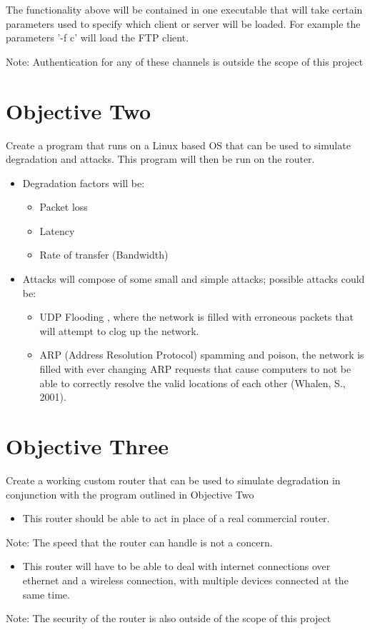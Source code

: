 The functionality above will be contained in one executable that will take certain parameters used to specify which client or server will be loaded. For example the parameters '-f c' will load the FTP client.

Note: Authentication for any of these channels is outside the scope of this project


\section{Objective Two}
\label{sec:obj2}
\label{ref:obj2}
Create a program that runs on a Linux based OS that can be used to simulate degradation and attacks. This program will then be run on the router.

\begin{itemize}
\item Degradation factors will be:
	\begin{itemize}
	\item Packet loss
	\item Latency
	\item Rate of transfer (Bandwidth)
	\end{itemize}
\item Attacks will compose of some small and simple attacks; possible attacks could be:
	\begin{itemize}
	\item UDP Flooding \citep{xiaoming2010denial}, where the network is filled with erroneous packets that will attempt to clog up the network.
	\item ARP (Address Resolution Protocol) spamming and poison, the network is filled with ever changing ARP requests that cause computers to not be able to correctly resolve the 	valid locations of each other (Whalen, S., 2001).
	\end{itemize}
\end{itemize}

\section{Objective Three}
\label{ref:obj3}
Create a working custom router that can be used to simulate degradation in conjunction with the program outlined in Objective Two

\begin{itemize}
\item This router should be able to act in place of a real commercial router. 
\end{itemize}
Note: The speed that the router can handle is not a concern.
\begin{itemize}
\item This router will have to be able to deal with internet connections over ethernet and a wireless connection, with multiple devices connected at the same time.
\end{itemize}
Note: The security of the router is also outside of the scope of this project

